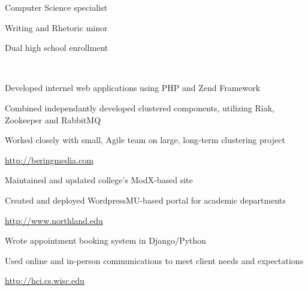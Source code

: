 \documentclass[letterpaper,11pt,notitlepage]{article}
\begin{document}

\vbar
{}
    \begin{employment}
        \item Computer Science specialist
        \item Writing and Rhetoric minor
    \end{employment}
    \begin{employment}
        \item Dual high school enrollment
    \end{employment}

\vbar
{}
         \\
        \begin{employment}
            \item Developed internel web applications using PHP and Zend 
            Framework
            \item Combined independantly developed clustered components, 
            utilizing Riak, Zookeeper and RabbitMQ 
            \item Worked closely with small, Agile team on large, long-term 
            clustering project 
            \item \url{http://beringmedia.com}
        \end{employment}
        \begin{employment}
            \item Maintained and updated college's ModX-based site
            \item Created and deployed WordpressMU-based portal for academic
            departments 
            \item \url{http://www.northland.edu}
        \end{employment}
        \begin{employment}
            \item Wrote appointment booking system in Django/Python 
            \item Used online and in-person communications to meet client needs
            and expectations
            \item \url{http://hci.cs.wisc.edu}
        \end{employment}
\end{document}
